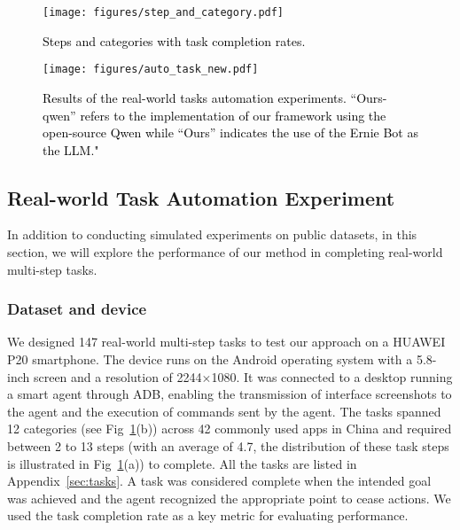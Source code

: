 \begin{figure}
    \centering
    \texttt{[image: figures/step\_and\_category.pdf]}
    \caption{\textcolor{black}{Steps and categories with task completion rates.}}
    \label{fig:category}
\end{figure}

\begin{figure*}
    \centering
    \texttt{[image: figures/auto\_task\_new.pdf]}
    \caption{\textcolor{black}{Results of the real-world tasks automation experiments. ``Ours-qwen'' refers to the implementation of our framework using the open-source Qwen while ``Ours'' indicates the use of the Ernie Bot as the LLM."}}
    \label{fig:task}
\end{figure*}

\subsection{Real-world Task Automation Experiment}
\label{sec:7_3}
In addition to conducting simulated experiments on public datasets, in this section, we will explore the performance of our method in completing real-world multi-step tasks.

\subsubsection{Dataset and device}
We designed 147 real-world multi-step tasks to test our approach on a HUAWEI P20 smartphone. The device runs on the Android operating system with a 5.8-inch screen and a resolution of 2244$\times$1080. It was connected to a desktop running a smart agent through ADB, enabling the transmission of interface screenshots to the agent and the execution of commands sent by the agent. The tasks spanned 12 categories (see Fig~\ref{fig:category}(b)) across 42 commonly used apps in China and required between 2 to 13 steps (with an average of 4.7, the distribution of these task steps is illustrated in Fig~\ref{fig:category}(a)) to complete. All the tasks are listed in Appendix~\ref{sec:tasks}. A task was considered complete when the intended goal was achieved and the agent recognized the appropriate point to cease actions. We used the task completion rate as a key metric for evaluating performance. 

